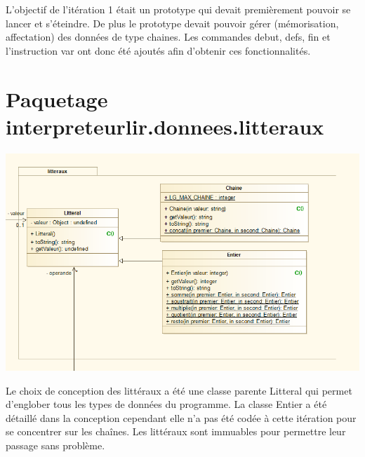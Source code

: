 \par L'objectif de l'itération 1 était un prototype qui devait premièrement pouvoir se lancer et s'éteindre. De plus le prototype devait pouvoir gérer (mémorisation, affectation) des données de type chaines. Les commandes debut, defs, fin et l'instruction var ont donc été ajoutés afin d'obtenir ces fonctionnalités.

\section{Paquetage interpreteurlir.donnees.litteraux}
\begin{center}\includegraphics[scale=0.75]{fichiers/dossierPartieConception/img/COO/COO_prototype_1/PackageLitteraux}\end{center}
\par Le choix de conception des littéraux a été une classe parente Litteral qui permet d'englober tous les types de données du programme.
La classe Entier a été détaillé dans la conception cependant elle n'a pas été codée à cette itération pour se concentrer sur les chaînes.
Les littéraux sont immuables pour permettre leur passage sans problème.

